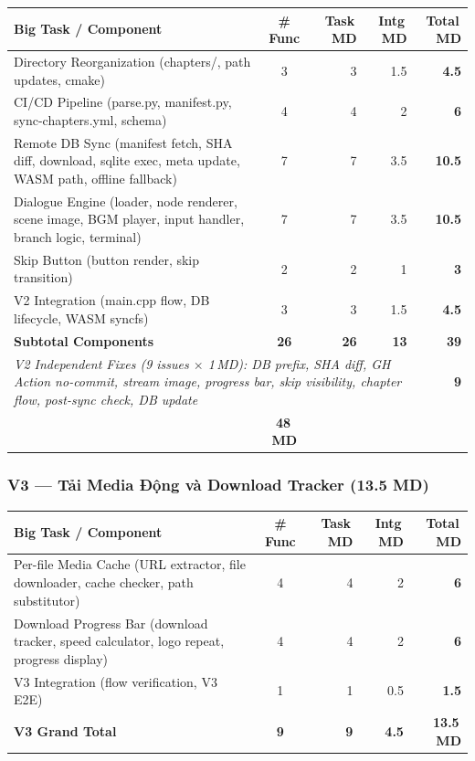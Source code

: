 \documentclass[12pt,a4paper]{article}
\begin{document}
\begin{tabularx}{\linewidth}{|X|c|r|r|r|}
\hline
\rowcolor{storyBlue!18}
\textbf{Big Task / Component} & \textbf{\# Func} & \textbf{Task\,MD} & \textbf{Intg\,MD} & \textbf{Total\,MD} \\
\hline
\rowcolor{rowLight}
Directory Reorganization (chapters/, path updates, cmake) & 3 & 3 & 1.5 & \textbf{4.5} \\
CI/CD Pipeline (parse.py, manifest.py, sync-chapters.yml, schema) &
4 & 4 & 2 & \textbf{6} \\
\rowcolor{rowLight}
Remote DB Sync (manifest fetch, SHA diff, download, sqlite exec, meta update, WASM path, offline fallback) & 7 & 7 & 3.5 & \textbf{10.5} \\
Dialogue Engine (loader, node renderer, scene image, BGM player, input handler, branch logic, terminal) & 7 & 7 & 3.5 & \textbf{10.5} \\
\rowcolor{rowLight}
Skip Button (button render, skip transition) & 2 & 2 & 1 & \textbf{3} \\
V2 Integration (main.cpp flow, DB lifecycle, WASM syncfs) & 3 & 3 & 1.5 & \textbf{4.5} \\
\hline
\rowcolor{storyBlue!12}
\textbf{Subtotal Components} & \textbf{26} & \textbf{26} & \textbf{13} & \textbf{39} \\
\hline
\multicolumn{4}{|p{0.82\linewidth}|}{\raggedright \textit{V2 Independent Fixes (9 issues $\times$ 1\,MD): DB prefix, SHA diff, GH Action no-commit, stream image, progress bar, skip visibility, chapter flow, post-sync check, DB update}} & \textbf{9} \\
\hline
\rowcolor{v2amber!15}
\multicolumn{4}{|l|}{\textbf{V2 Grand Total}} & \textbf{48\,MD} \\
\hline
\end{tabularx}

\subsubsection{V3 — Tải Media Động và Download Tracker (13.5 MD)}

\begin{tabularx}{\linewidth}{|X|c|r|r|r|}
\hline
\rowcolor{storyBlue!18}
\textbf{Big Task / Component} & \textbf{\# Func} & \textbf{Task\,MD} & \textbf{Intg\,MD} & \textbf{Total\,MD} \\
\hline
\rowcolor{rowLight}
Per-file Media Cache (URL extractor, file downloader, cache checker, path substitutor) & 4 & 4 & 2 & \textbf{6} \\
Download Progress Bar (download tracker, speed calculator, logo repeat, progress display) & 4 & 4 & 2 & \textbf{6} \\
\rowcolor{rowLight}
V3 Integration (flow verification, V3 E2E) & 1 & 1 & 0.5 & \textbf{1.5} \\
\hline
\rowcolor{v3red!15}
\textbf{V3
Grand Total} & \textbf{9} & \textbf{9} & \textbf{4.5} & \textbf{13.5\,MD} \\
\hline
\end{tabularx}
\end{document}
